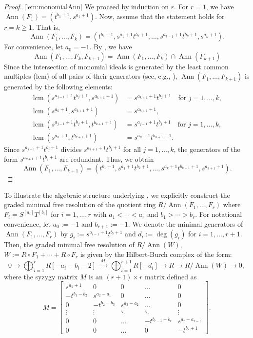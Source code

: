 \documentclass[a4paper, 11pt]{amsart}
\numberwithin{theorem}{section}
\theoremstyle{definition}
\numberwithin{equation}{section}
\DeclareMathOperator{\Ann}{\operatorname{Ann}}
\DeclareMathOperator{\lcm}{\operatorname{lcm}}
\begin{document}
\begin{proof}
\eqref{lem:monomialAnn} We proceed by induction on $r$. 
For $r=1$, we have $\Ann(F_1) = (t^{b_1+1}, s^{a_1+1})$.
Now, assume that the statement holds for $r=k \geq 1$.
That is,
\[
\Ann(F_1,\dots,F_k) = (t^{b_1+1}, s^{a_1+1}t^{b_2+1}, \dots, s^{a_{k-1}+1}t^{b_k+1}, s^{a_k+1}).
\]
For convenience, let $a_0 = -1$. 
By , we have
\[
\Ann(F_1,\dots, F_k ,F_{k+1}) = \Ann(F_1,\dots,F_k) \cap \Ann(F_{k+1})
\]
Since the intersection of monomial ideals is generated by the least common multiples (lcm) of all pairs of their generators (see, e.g., \cite[Proposition 1.2.1]{MR2724673}), $\Ann(F_1,\dots,F_{k+1})$ is generated by the following elements:
\begin{align*}
    \lcm(s^{a_{j-1}+1}t^{b_j+1}, s^{a_{k+1}+1}) &= s^{a_{k+1}+1}t^{b_j+1} \quad \text{for } j = 1, \dots, k, \\
    \lcm(s^{a_k+1}, s^{a_{k+1}+1}) &= s^{a_{k+1}+1}, \\
    \lcm(s^{a_{j-1}+1}t^{b_j+1}, t^{b_{k+1}+1}) &= s^{a_{j-1}+1}t^{b_j+1} \quad \text{for } j = 1, \dots, k, \\
    \lcm(s^{a_k+1}, t^{b_{k+1}+1}) &= s^{a_k+1}t^{b_{k+1}+1}.
\end{align*}
Since $s^{a_{j-1}+1}t^{b_j+1}$ divides $s^{a_{k+1}+1}t^{b_j+1}$ for all $j = 1, \dots, k$, the generators of the form $s^{a_{k+1}+1}t^{b_j+1}$ are redundant. 
Thus, we obtain
\[
\Ann(F_1,\dots,F_{k+1}) = (t^{b_1+1}, s^{a_1+1}t^{b_2+1}, \dots, s^{a_k+1}t^{b_{k+1}+1}, s^{a_{k+1}+1}).
\]
\end{proof}

To illustrate the algebraic structure underlying , we explicitly construct the graded minimal free resolution of the quotient ring $R/\Ann(F_1,\dots,F_r)$ where $F_i = S^{[a_i]}T^{[b_i]}$ for $i = 1,\dots,r$ with $a_1<\cdots<a_r$ and $b_1>\cdots>b_r$.
For notational convenience, let $a_0 := -1$ and $b_{r+1} := -1$. 
We denote the minimal generators of $\Ann(F_1, \dots, F_r)$ by $g_i := s^{a_{i-1}+1}t^{b_i+1}$ and $d_i := \deg(g_i)$ for $i = 1, \dots, r+1$.
Then, the graded minimal free resolution of $R/\Ann(W)$, $W := R\circ F_1 +\cdots+ R\circ F_r$ is given by the Hilbert-Burch complex of the form:
\[
0 \longrightarrow \bigoplus_{i=1}^r R[-a_i-b_i-2] \xrightarrow{\;\; M \;\;} \bigoplus_{i=1}^{r+1} R[-d_i] \longrightarrow R \longrightarrow R/\Ann(W) \longrightarrow 0,
\]
where the syzygy matrix $M$ is an $(r+1) \times r$ matrix defined as
\[
M = \begin{bmatrix}
    s^{a_1+1} & 0 & 0 & \dots & 0 \\
    -t^{b_1-b_2} & s^{a_2-a_1} & 0 & \dots & 0 \\
    0 & -t^{b_2-b_3} & s^{a_3-a_2} & \dots & 0 \\
    \vdots & \vdots & \ddots & \ddots & \vdots \\
    0 & 0 & \dots & -t^{b_{r-1}-b_r} & s^{a_r-a_{r-1}} \\
    0 & 0 & \dots & 0 & -t^{b_r+1}
\end{bmatrix}.
\]
\end{document}
